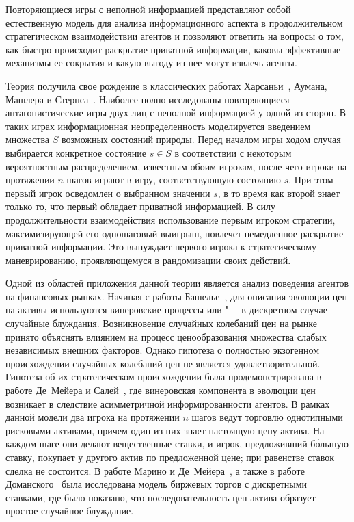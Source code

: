 {\actuality} 
Повторяющиеся игры с неполной информацией представляют собой естественную модель для анализа информационного аспекта в продолжительном стратегическом взаимодействии агентов и позволяют ответить на вопросы о том, как быстро происходит раскрытие приватной информации, каковы эффективные механизмы ее сокрытия и какую выгоду из нее могут извлечь агенты.

Теория получила свое рождение в классических работах Харсаньи~\cite{harsanyi67}, Аумана, Машлера и Стернса~\cite{aumann95}. 
Наиболее полно исследованы повторяющиеся антагонистические игры двух лиц с неполной информацией у одной из сторон. 
В таких играх информационная неопределенность моделируется введением множества $S$ возможных состояний природы. 
Перед началом игры ходом случая выбирается конкретное состояние $s \in S$ в соответствии с некоторым вероятностным распределением, известным обоим игрокам, после чего игроки на протяжении $n$ шагов играют в игру, соответствующую состоянию $s$.
При этом первый игрок осведомлен о выбранном значении $s$, в то время как второй знает только то, что первый обладает приватной информацией. 
В силу продолжительности взаимодействия использование первым игроком стратегии, максимизирующей его одношаговый выигрыш, повлечет немедленное раскрытие приватной информации. Это вынуждает первого игрока к стратегическому маневрированию, проявляющемуся в рандомизации своих действий.

Одной из областей приложения данной теории является анализ поведения агентов на финансовых рынках.
Начиная с работы Башелье~\cite{bachelier1900}, для описания эволюции цен на активы используются винеровские процессы или "--- в дискретном случае --- случайные блуждания.
Возникновение случайных колебаний цен на рынке принято объяснять влиянием на процесс ценообразования множества слабых независимых внешних факторов. 
Однако гипотеза о полностью экзогенном происхождении случайных колебаний цен не является удовлетворительной.
Гипотеза об их стратегическом происхождении была продемонстрирована в работе Де~Мейера и Салей~\cite{demeyer02}, где винеровская компонента в эволюции цен возникает в
следствие асимметричной информированности агентов. 
В рамках данной модели два игрока на протяжении $n$ шагов ведут торговлю однотипными рисковыми активами, причем один из них знает настоящую цену актива. 
На каждом шаге они делают вещественные ставки, и игрок, предложивший б\'{о}льшую ставку, покупает у
другого актив по предложенной цене; при равенстве ставок сделка не состоится.
В работе Марино и Де~Мейера~\cite{demeyer05}, а также в работе Доманского~\cite{domansky07} была исследована модель биржевых торгов с дискретными ставками, где было показано, что последовательность цен актива образует простое случайное блуждание.

